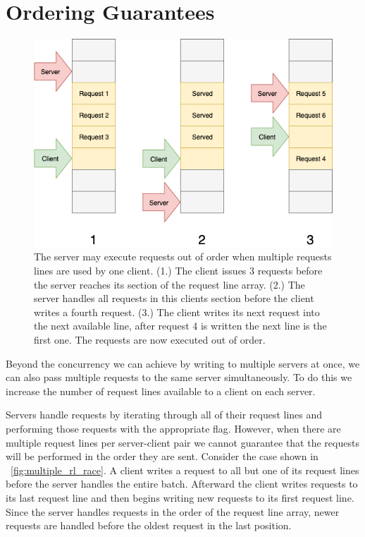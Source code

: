 \documentclass{uicthesi}
\begin{document}
\section{Ordering Guarantees}
\begin{figure}[ht!]
\centering
\includegraphics[width=0.9\columnwidth]{FIG/multiple_rl_race.png}
\caption{The server may execute requests out of order when multiple requests lines are used by one client. (1.) The client issues 3 requests before the server reaches its section of the request line array. (2.) The server handles all requests in this clients section before the client writes a fourth request. (3.) The client writes its next request into the next available line, after request 4 is written the next line is the first one. The requests are now executed out of order.}
\label{fig:mulitple_rl_race}
\end{figure}
Beyond the concurrency we can achieve by writing to multiple servers at once, we can also pass multiple requests to the same server simultaneously. To do this we increase the number of request lines available to a client on each server. 

Servers handle requests by iterating through all of their request lines and performing those requests with the appropriate flag. However, when there are multiple request lines per server-client pair we cannot guarantee that the requests will be performed in the order they are sent. Consider the case shown in ~\ref{fig:multiple_rl_race}.  A client writes a request to all but one of its request lines before the server handles the entire batch. Afterward the client writes requests to its last request line and then begins writing new requests to its first request line. Since the server handles requests in the order of the request line array, newer requests are handled before the oldest request in the last position. 
\end{document}
